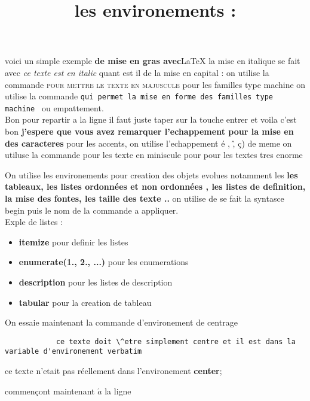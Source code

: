\documentclass{article}
\begin{document}
	voici un simple exemple \textbf{de mise en gras avec}\LaTeX{} la mise en italique se fait avec \textit{ce texte est en italic} quant est il de la mise en capital : on utilise la commande \textsc{pour mettre le texte en majuscule} pour les familles type machine on utilise la commande \texttt{qui permet la mise en forme des familles type machine } ou \textsf{empattement}.\\
	
		Bon pour repartir a la ligne il faut juste taper sur la touche entrer et voila c'est bon \textbf{j'espere que vous avez remarquer
    l'echappement pour la mise en des caracteres } pour les accents, on utilise l'echappement \textsf{ \large \'e , \^ , \c{c})} de meme on utiluse la commande {\tiny pour les texte en miniscule} pour {\huge pour les textes tres enorme}\\
		\title{les environements : }
	On utilise les environements pour creation des objets evolues notamment les \textbf{les tableaux, les listes ordonn\'ees et non ordonn\'ees , les listes de definition, la mise des fontes, les taille des texte ..} on utilise de se fait la syntasce begin{} puis le nom de la commande a appliquer.\\
	Exple de listes :
	\begin{itemize}
		
		\item \textbf{itemize} pour definir les listes
		\item \textbf{enumerate(1., 2., ...) }pour les enumerations
		\item \textbf{description} pour les listes de description
		\item \textbf{tabular} pour la creation de tableau
	\end{itemize}		 
	On essaie maintenant la commande d'environement de centrage
	\begin{center}
		\begin{verbatim}
			ce texte doit \^etre simplement centre et il est dans la variable d'environement verbatim 
		\end{verbatim}
ce texte n'etait pas r\'eellement dans l'environement \textbf{center};
	\end{center}

commen\c{c}ont maintenant $\acute{a}$ la ligne
\end{document}
